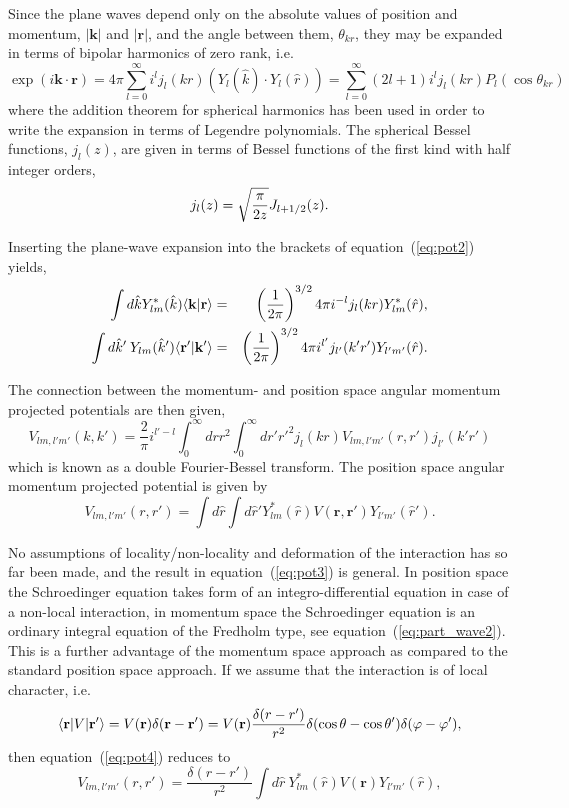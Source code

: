 \documentclass[graybox,sectrefs,envcountresetchap,open=right]{svmonodo}
\begin{document}
Since the plane waves depend only on the absolute values of position and momentum, $\vert\mathbf{k}\vert$ and 
$\vert\mathbf{r}\vert$,
and the angle between them, $\theta_{kr}$, they may be expanded in terms of bipolar harmonics of 
zero rank, i.e.  
\[ 
  \exp{(i \mathbf{k}\cdot \mathbf{r})} = 4\pi\sum_{l=0}^{\infty} i^l j_l(kr)\left( Y_l(\hat{k}) \cdot Y_l(\hat{r}) \right)= \sum_{l=0}^{\infty} (2l+1)i^l j_l(kr) P_l(\cos \theta_{kr}) 
\]
where the addition theorem for spherical harmonics has been used in order to write
the expansion in terms of Legendre polynomials. The spherical Bessel functions, $j_l(z)$,  
are given in terms of Bessel functions of the first kind with half integer orders,  
\[
j_l(z) = \sqrt{\pi \over 2 z} J_{l+1/2}(z).  
\]



Inserting the plane-wave expansion
into the brackets of equation~(\ref{eq:pot2}) yields, 
\begin{eqnarray*}
  \nonumber
  \int d{\hat{k}}  Y_{lm}^*(\hat{k})\langle \mathbf{k}\vert \mathbf{r} \rangle & = &  
  \left( {1\over 2\pi} \right) ^{3/2}4\pi i^{-l} j_l(kr) Y_{lm}^*(\hat{r}), \\  
  \nonumber
  \int d{\hat{k}'}\:   Y_{lm}(\hat{k}') \langle \mathbf{r'}\vert \mathbf{k}' \rangle & = &  
  \left( {1\over 2\pi} \right) ^{3/2}4\pi i^{l'} j_{l'}(k'r') Y_{l'm'}(\hat{r}). 
\end{eqnarray*}



The connection between the momentum- and position space angular momentum 
projected potentials are then given, 
\[
  V_{lm, l'm'}(k,k')=\frac{2}{\pi}i^{l'-l}\int_0^\infty drr^2 \int_0^\infty dr'{r'}^2j_l(kr) V_{lm,l'm'}(r,r') j_{l'}(k'r')
  \label{eq:pot3}
\]
which is known as a double Fourier-Bessel transform. The position space angular 
momentum projected potential is given by
\[
  V_{lm, l'm'}(r,r') = \int d{\hat{r}} \int d{\hat{r}'}Y_{lm}^*(\hat{r})V(\mathbf{r}, \mathbf{r'})Y_{l'm'}(\hat{r}').
  \label{eq:pot4}
\]



No assumptions of locality/non-locality and deformation of the interaction has so far been made, 
and the result in equation~(\ref{eq:pot3}) is general. In position space the Schroedinger equation 
takes form of an integro-differential equation in case of a non-local interaction, 
in momentum space the Schroedinger equation is an ordinary integral equation of the Fredholm type, 
see equation~(\ref{eq:part_wave2}). This is a further advantage of the momentum space approach as compared to 
the standard position space approach.  
If we assume that the 
interaction is of local character, i.e. 
\[
  \langle \mathbf{r}\vert V \vert \mathbf{r'}\rangle = V(\mathbf{r}) \delta( \mathbf{r}-\mathbf{r}' ) = 
  V(\mathbf{r}) {\delta( { r}-{r}' ) \over r^2} \delta ( \cos \theta - \cos \theta' ) \delta (\varphi-\varphi'), 
\]
then equation~(\ref{eq:pot4}) reduces to 
\begin{equation}
  V_{lm, l'm'}(r,r') = \frac{\delta({r}-{r}')}{r^2}\int d{\hat{r}}\:
  Y_{lm}^*(\hat{r})V(\mathbf{r})Y_{l'm'}(\hat{r}),
  \label{eq:pot5}
\end{equation}
\end{document}
